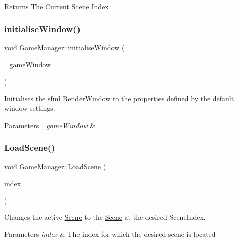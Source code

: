 \begin{DoxyReturn}{Returns}
The Current \hyperlink{class_scene}{Scene} Index 
\end{DoxyReturn}
\mbox{\label{class_game_manager_a0a4c03ef0451371a98204c18c1faf9fd}} 
\subsubsection{\texorpdfstring{initialise\+Window()}{initialiseWindow()}}
{\footnotesize\ttfamily void Game\+Manager\+::initialise\+Window (\begin{DoxyParamCaption}\item[{sf\+::\+Render\+Window \&}]{\+\_\+game\+Window }\end{DoxyParamCaption})\hspace{0.3cm}{\ttfamily [private]}}



Initialises the sfml Render\+Window to the properties defined by the default window settings. 


\begin{DoxyParams}{Parameters}
{\em \+\_\+game\+Window} & \\
\hline
\end{DoxyParams}
\mbox{\label{class_game_manager_a09b8801bcfdd8d5cbc52e27895b84e3b}} 
\subsubsection{\texorpdfstring{Load\+Scene()}{LoadScene()}}
{\footnotesize\ttfamily void Game\+Manager\+::\+Load\+Scene (\begin{DoxyParamCaption}\item[{unsigned int}]{index }\end{DoxyParamCaption})\hspace{0.3cm}{\ttfamily [virtual]}}



Changes the active \hyperlink{class_scene}{Scene} to the \hyperlink{class_scene}{Scene} at the desired Scene\+Index. 


\begin{DoxyParams}{Parameters}
{\em index} & The index for which the desired scene is located \\
\hline
\end{DoxyParams}


